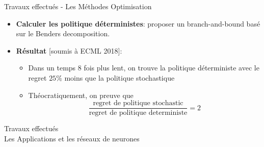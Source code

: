 \documentclass{beamer}
\begin{document}
{{\begin{frame}{Travaux effectués - Les Méthodes Optimisation}
\begin{itemize}
\item \textbf{Calculer les politique déterministes}: proposer un branch-and-bound basé sur le Benders decomposition. %
\item \textbf{Résultat} [soumis à ECML 2018]: 
	\begin{itemize}
	\item Dans un temps $8$ fois plus lent, on trouve la politique déterministe avec le regret 	$25 \%$ moins que la politique stochastique   
	\item Théocratiquement, on preuve que 
	$$\frac{\text{regret de politique stochastic}}{\text{regret de politique deterministe}} = 2 $$
	\end{itemize}
\end{itemize}

\end{frame}

\begin{frame}{Travaux effectués \\ Les Applications et les réseaux de neurones}

\begin{columns}
\begin{column}{0.6\textwidth}
   

\end{column}
\end{columns}
\end{frame}}}
\end{document}

